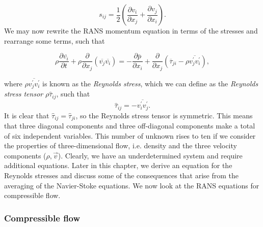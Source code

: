 \begin{equation}
    s_{ij} = \frac{1}{2}\left(\frac{\partial v_i}{\partial x_j}+\frac{\partial v_j
    }{\partial x_i}\right).
\end{equation}
We may now rewrite the RANS momentum equation in terms of the stresses and rearrange some terms, such that
\begin{eqBox}
\begin{equation}
    \rho \frac{\partial \overline{v_i}}{\partial t} 
    + \rho  \frac{\partial}{\partial x_j} \left(\overline{v_j}\overline{v_i}\right)
    =- \frac{\partial \overline{p}}{\partial x_i} 
    + \frac{\partial}{\partial x_j} \left(\overline\tau_{ji} - \rho \overline{v_j^\prime v_i^\prime}\right),
\end{equation}
\end{eqBox}
where $\rho \overline{v_j^\prime v_i^\prime}$ is known as the \textit{Reynolds stress}, which we can define as the \textit{Reynolds stress tensor} $\rho\hat\tau_{ij}$, such that
\begin{equation}
	\hat\tau_{ij} = -\overline{v_i^\prime v_j^\prime}.
\end{equation}
It is clear that $\hat\tau_{ij}=\hat\tau_{ji}$, so the Reynolds stress tensor is symmetric. This means that three diagonal components and three off-diagonal components make a total of six independent variables. This number of unknown rises to ten if we consider the properties of three-dimensional flow, i.e. density and the three velocity components ($\rho, \vec{v}$). Clearly, we have an underdetermined system and require additional equations. Later in this chapter, we derive an equation for the Reynolds stresses and discuss some of the consequences that arise from the averaging of the Navier-Stoke equations. We now look at the RANS equations for compressible flow.

\subsubsection{Compressible flow}

